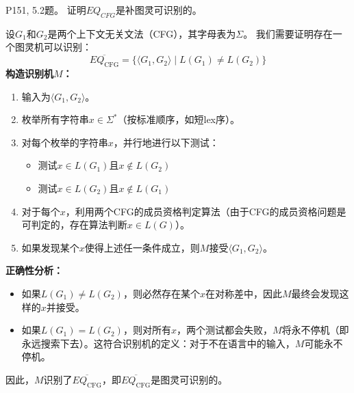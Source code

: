 \documentclass[11pt,addpoints,answers]{exam}
\begin{document}
\begin{questions}
\question P151, 5.2题。
证明$EQ_{\textit{CFG}}$是补图灵可识别的。
\begin{solution}
	设$G_1$和$G_2$是两个上下文无关文法（CFG），其字母表为$\Sigma$。
    我们需要证明存在一个图灵机可以识别：
    \[
    \overline{EQ_{\text{CFG}}} = \{\langle G_1, G_2 \rangle \mid L(G_1) \neq L(G_2)\}
    \]
    \noindent \textbf{构造识别机$M$：}
    \begin{enumerate}[label=步骤\arabic*:, leftmargin=*]
        \item 输入为$\langle G_1, G_2 \rangle$。
        \item 枚举所有字符串$x \in \Sigma^*$（按标准顺序，如短lex序）。
        \item 对每个枚举的字符串$x$，并行地进行以下测试：
        \begin{itemize}
            \item 测试$x \in L(G_1)$且$x \notin L(G_2)$
            \item 测试$x \in L(G_2)$且$x \notin L(G_1)$
        \end{itemize}
        \item 对于每个$x$，利用两个CFG的成员资格判定算法（由于CFG的成员资格问题是可判定的，存在算法判断$x \in L(G)$）。
        \item 如果发现某个$x$使得上述任一条件成立，则$M$接受$\langle G_1, G_2 \rangle$。
    \end{enumerate}
    
    \noindent \textbf{正确性分析：}
    \begin{itemize}
        \item 如果$L(G_1) \neq L(G_2)$，则必然存在某个$x$在对称差中，因此$M$最终会发现这样的$x$并接受。
        \item 如果$L(G_1) = L(G_2)$，则对所有$x$，两个测试都会失败，$M$将永不停机（即永远搜索下去）。这符合识别机的定义：对于不在语言中的输入，$M$可能永不停机。
    \end{itemize}
    
    因此，$M$识别了$\overline{EQ_{\text{CFG}}}$，即$\overline{EQ_{\text{CFG}}}$是图灵可识别的。
\end{solution}








\end{questions}
\end{document}
